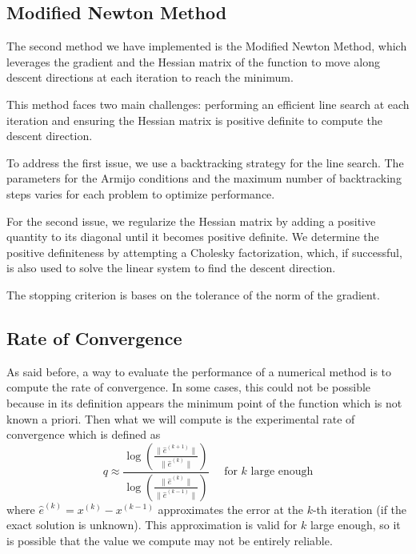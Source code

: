 \subsection*{Modified Newton Method}
The second method we have implemented is the Modified Newton Method, which leverages the gradient and the Hessian matrix of the function to move along descent directions at each iteration to reach the minimum.

This method faces two main challenges: performing an efficient line search at each iteration and ensuring the Hessian matrix is positive definite to compute the descent direction.

To address the first issue, we use a backtracking strategy for the line search. The parameters for the Armijo conditions and the maximum number of backtracking steps varies for each problem to optimize performance.

For the second issue, we regularize the Hessian matrix by adding a positive quantity to its diagonal until it becomes positive definite. We determine the positive definiteness by attempting a Cholesky factorization, which, if successful, is also used to solve the linear system to find the descent direction.

The stopping criterion is bases on the tolerance of the norm of the gradient.


\subsection*{Rate of Convergence}
As said before, a way to evaluate the performance of a numerical method is to compute the rate of convergence. In some cases, this could not be possible because in its definition appears the minimum point of the function which is not known a priori.
Then what we will compute is the experimental rate of convergence which is defined as 
\begin{equation}
    q \approx \frac{ \log \left(\frac{\| \hat{e}^{(k+1)} \|}{\| \hat{e}^{(k)} \|} \right)}{ \log \left(\frac{\| \hat{e}^{(k)} \|}{\| \hat{e}^{(k-1)} \|} \right)}
    \quad \text{ for $k$ large enough}
    \label{definizione_roc}
\end{equation}
where $\hat{e}^{(k)} = x^{(k)} - x^{(k-1)}$ approximates the error at the $k$-th iteration (if the exact solution is unknown).
This approximation is valid for $k$ large enough, so it is possible that the value we compute may not be entirely reliable.
